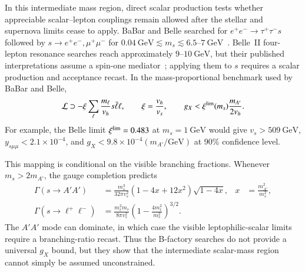 \documentclass[onecolumn, aps, nofootinbib, prd, preprint, floats, floatfix, amsmath, amssymb, superscriptaddress, preprintnumbers]{revtex4-2}
\begin{document}
In this intermediate mass region, direct scalar production tests whether appreciable scalar--lepton couplings remain allowed after the stellar and supernova limits cease to apply. BaBar and Belle searched for $e^+e^-\to\tau^+\tau^-s$ followed by $s\to e^+e^-,\mu^+\mu^-$ for $0.04~\mathrm{GeV}\lesssim m_s\lesssim6.5$--$7~\mathrm{GeV}$~\cite{BaBar:2020jma,Belle:2022gbl}. Belle~II four-lepton resonance searches reach approximately $9$--$10~\mathrm{GeV}$, but their published interpretations assume a spin-one mediator~\cite{Belle-II:2024wtd,Belle-II:2023ydz}; applying them to $s$ requires a scalar production and acceptance recast. In the mass-proportional benchmark used by BaBar and Belle,
\begin{equation}
\mathcal L\supset-\xi\sum_\ell\frac{m_\ell}{v_h}s\bar\ell\ell,
\qquad
\xi=\frac{v_h}{v_s},
\qquad
g_X<\xi^{\rm lim}(m_s)\frac{m_{A'}}{2v_h}.
\label{eq:scalar-collider-map}
\end{equation}
For example, the Belle limit $\xi^{\rm lim}=0.483$ at $m_s=1~\mathrm{GeV}$ would give $v_s>509~\mathrm{GeV}$, $y_{s\mu\mu}<2.1\times10^{-4}$, and $g_X<9.8\times10^{-4}(m_{A'}/\mathrm{GeV})$ at 90\% confidence level.

This mapping is conditional on the visible branching fractions. Whenever $m_s>2m_{A'}$, the gauge completion predicts
\begin{equation}
\begin{aligned}
\Gamma(s\to A'A')&=\frac{m_s^3}{32\pi v_s^2}
\left(1-4x+12x^2\right)\sqrt{1-4x},
&x&=\frac{m_{A'}^2}{m_s^2},\\
\Gamma(s\to\ell^+\ell^-)&=\frac{m_\ell^2m_s}{8\pi v_s^2}
\left(1-\frac{4m_\ell^2}{m_s^2}\right)^{3/2}.
\end{aligned}
\label{eq:scalar-partial-widths}
\end{equation}
The $A'A'$ mode can dominate, in which case the visible leptophilic-scalar limits require a branching-ratio recast. Thus the B-factory searches do not provide a universal $g_X$ bound, but they show that the intermediate scalar-mass region cannot simply be assumed unconstrained.
\end{document}
